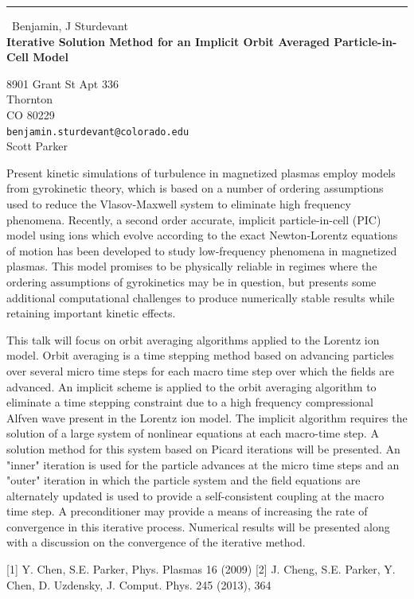 \documentclass{report}
\begin{document}
\begin{center}
\rule{6in}{1pt} \
{\large Benjamin, J Sturdevant \\
{\bf Iterative Solution Method for an Implicit Orbit Averaged Particle-in-Cell Model}}

8901 Grant St Apt 336 \\ Thornton \\ CO 80229
\\
{\tt benjamin.sturdevant@colorado.edu}\\
Scott Parker\end{center}

Present kinetic simulations of turbulence in magnetized plasmas employ
models from gyrokinetic theory, which is based on a number of ordering
assumptions used to reduce the Vlasov-Maxwell system to eliminate high
frequency phenomena. Recently, a second order accurate, implicit
particle-in-cell (PIC) model using ions which evolve according to the
exact Newton-Lorentz equations of motion has been developed to study
low-frequency phenomena in magnetized plasmas. This model promises to be
physically reliable in regimes where the ordering assumptions of
gyrokinetics may be in question, but presents some additional
computational challenges to produce numerically stable results while
retaining important kinetic effects.

This talk will focus on orbit averaging algorithms applied to the Lorentz
ion model. Orbit averaging is a time stepping method based on advancing
particles over several micro time steps for each macro time step over
which the fields are advanced. An implicit scheme is applied to the orbit
averaging algorithm to eliminate a time stepping constraint due to a high
frequency compressional Alfven wave present in the Lorentz ion model. The
implicit algorithm requires the solution of a large system of nonlinear
equations at each macro-time step. A solution method for this system
based on Picard iterations will be presented. An "inner" iteration is
used for the particle advances at the micro time steps and an "outer"
iteration in which the particle system and the field equations are
alternately updated is used to provide a self-consistent coupling at the
macro time step. A preconditioner may provide a means of increasing the
rate of convergence in this iterative process. Numerical results will be
presented along with a discussion on the convergence of the iterative
method.

[1] Y. Chen, S.E. Parker, Phys. Plasmas 16 (2009)
[2] J. Cheng, S.E. Parker, Y. Chen, D. Uzdensky, J. Comput. Phys. 245 (2013), 364
\end{document}
